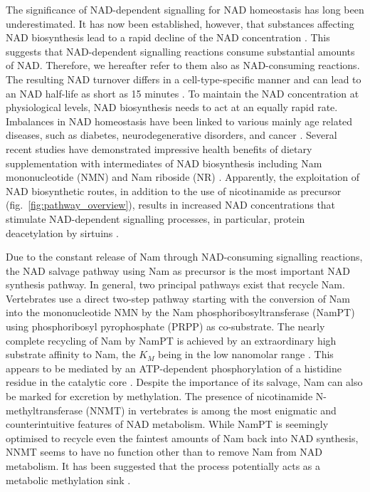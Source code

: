The significance of NAD-dependent signalling for NAD homeostasis has long been underestimated. It has now been established, however, that substances affecting NAD biosynthesis lead to a rapid decline of the NAD concentration \cite{Buonvicino2018}. This suggests that NAD-dependent signalling reactions consume substantial amounts of NAD. Therefore, we hereafter refer to them also as NAD-consuming reactions. The resulting NAD turnover differs in a cell-type-specific manner and can lead to an NAD half-life as short as 15 minutes \cite{Liu2018}. To maintain the NAD concentration at physiological levels, NAD biosynthesis needs to act at an equally rapid rate. Imbalances in NAD homeostasis have been linked to various mainly age related diseases, such as diabetes, neurodegenerative disorders, and cancer \cite{Chiarugi2012,Verdin2015}. Several recent studies have demonstrated impressive health benefits of dietary supplementation with intermediates of NAD biosynthesis including Nam mononucleotide (NMN) and Nam riboside (NR) \cite{Yoshino2018}. Apparently, the exploitation of NAD biosynthetic routes, in addition to the use of nicotinamide as precursor (fig.~\ref{fig:pathway_overview}), results in increased NAD concentrations that stimulate NAD-dependent signalling processes, in particular, protein deacetylation by sirtuins \cite{North2004}.

Due to the constant release of Nam through NAD-consuming signalling reactions, the NAD salvage pathway using Nam as precursor is the most important NAD synthesis pathway. In general, two principal pathways exist that recycle Nam.  Vertebrates use a direct two-step pathway starting with the conversion of Nam into the mononucleotide NMN by the Nam phosphoribosyltransferase (NamPT) using phosphoribosyl pyrophosphate (PRPP) as co-substrate. The nearly complete recycling of Nam by NamPT is achieved by an extraordinary high substrate affinity to Nam, the $K_{M}$ being in the low nanomolar range \cite{Burgos2008}. This appears to be mediated by an ATP-dependent phosphorylation of a histidine residue in the catalytic core \cite{Burgos2009}. Despite the importance of its salvage, Nam can also be marked for excretion by methylation. The presence of nicotinamide N-methyltransferase (NNMT) in vertebrates \cite{Gossmann2012FEBS} is among the most enigmatic and counterintuitive features of NAD metabolism. While NamPT is seemingly optimised to recycle even the faintest amounts of Nam back into NAD synthesis, NNMT seems to have no function other than to remove Nam from NAD metabolism. It has been suggested that the process potentially acts as a metabolic methylation sink \cite{Pissios2017}.

